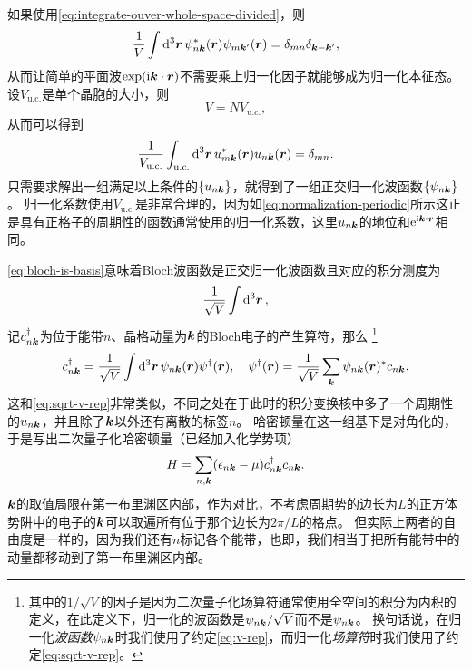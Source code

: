 如果使用\eqref{eq:integrate-ouver-whole-space-divided}，则
\begin{equation}
    \frac{1}{V} \int \dd[3]{\vb*{r}} \psi_{n\vb*{k}}^*(\vb*{r}) \psi_{m\vb*{k}'}(\vb*{r}) = \delta_{mn} \delta_{\vb*{k} - \vb*{k}'},
    \label{eq:bloch-is-basis}
\end{equation}
从而让简单的平面波$\exp(\mathrm{i} \vb*{k} \cdot \vb*{r})$不需要乘上归一化因子就能够成为归一化本征态。
设$V_\text{u.c.}$是单个晶胞的大小，则
\[
    V = N V_\text{u.c.},
\]
从而可以得到
\begin{equation}
    \frac{1}{V_\text{u.c.}} \int_\text{u.c.} \dd[3]{\vb*{r}} u_{m\vb*{k}}^*(\vb*{r}) u_{n\vb*{k}}(\vb*{r}) = \delta_{mn}.
\end{equation}
只需要求解出一组满足以上条件的$\{u_{n\vb*{k}}\}$，就得到了一组正交归一化波函数$\{\psi_{n\vb*{k}}\}$。
归一化系数使用$V_\text{u.c.}$是非常合理的，因为如\eqref{eq:normalization-periodic}所示这正是具有正格子的周期性的函数通常使用的归一化系数，这里$u_{n \vb*{k}}$的地位和$\mathrm{e}^{\mathrm{i} \vb*{k} \cdot \vb*{r}}$相同。

\eqref{eq:bloch-is-basis}意味着Bloch波函数是正交归一化波函数且对应的积分测度为
\[
    \frac{1}{\sqrt{V}} \int \dd[3]{\vb*{r}},
\]
记${c}_{n\vb*{k}}^\dagger$为位于能带$n$、晶格动量为$\vb*{k}$的Bloch电子的产生算符，那么%
\footnote{其中的$1/\sqrt{V}$的因子是因为二次量子化场算符通常使用全空间的积分为内积的定义，在此定义下，归一化的波函数是$\psi_{n\vb*{k}} / \sqrt{V}$而不是$\psi_{n\vb*{k}}$。
换句话说，在归一化\emph{波函数}$\psi_{n \vb*{k}}$时我们使用了约定\eqref{eq:v-rep}，而归一化\emph{场算符}时我们使用了约定\eqref{eq:sqrt-v-rep}。
}%
\begin{equation}
    {c}_{n \vb*{k}}^\dagger = \frac{1}{\sqrt{V}} \int \dd[3]{\vb*{r}} \psi_{n \vb*{k}}(\vb*{r}) {\psi}^\dagger(\vb*{r}), \quad \psi^\dagger(\vb*{r}) = \frac{1}{\sqrt{V}} \sum_{\vb*{k}} \psi_{n \vb*{k}}(\vb*{r})^* c_{n \vb*{k}}.
    \label{eq:bloch-transformation}
\end{equation}
这和\eqref{eq:sqrt-v-rep}非常类似，不同之处在于此时的积分变换核中多了一个周期性的$u_{n \vb*{k}}$，并且除了$\vb*{k}$以外还有离散的标签$n$。
哈密顿量在这一组基下是对角化的，于是写出二次量子化哈密顿量（已经加入化学势项）
\begin{equation}
    {H} = \sum_{n, \vb*{k}} (\epsilon_{n\vb*{k}} - \mu) {c}^\dagger_{n\vb*{k}} {c}_{n\vb*{k}}.
    \label{eq:bloch-band-hamiltonian}
\end{equation}
$\vb*{k}$的取值局限在第一布里渊区内部，作为对比，不考虑周期势的边长为$L$的正方体势阱中的电子的$\vb*{k}$可以取遍所有位于那个边长为$2\pi / L$的格点。
但实际上两者的自由度是一样的，因为我们还有$n$标记各个能带，也即，我们相当于把所有能带中的动量都移动到了第一布里渊区内部。


